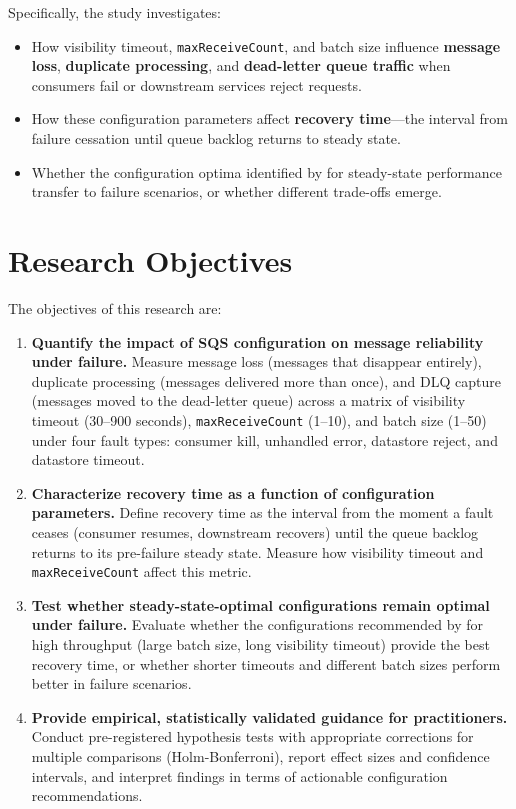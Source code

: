 Specifically, the study investigates:
\begin{itemize}
    \item How visibility timeout, \texttt{maxReceiveCount}, and batch size influence \textbf{message loss}, \textbf{duplicate processing}, and \textbf{dead-letter queue traffic} when consumers fail or downstream services reject requests.
    \item How these configuration parameters affect \textbf{recovery time}—the interval from failure cessation until queue backlog returns to steady state.
    \item Whether the configuration optima identified by \citet{Kyrychenko2025} for steady-state performance transfer to failure scenarios, or whether different trade-offs emerge.
\end{itemize}

\section{Research Objectives}

The objectives of this research are:

\begin{enumerate}
    \item \textbf{Quantify the impact of SQS configuration on message reliability under failure.} Measure message loss (messages that disappear entirely), duplicate processing (messages delivered more than once), and DLQ capture (messages moved to the dead-letter queue) across a matrix of visibility timeout (30–900 seconds), \texttt{maxReceiveCount} (1–10), and batch size (1–50) under four fault types: consumer kill, unhandled error, datastore reject, and datastore timeout.
    
    \item \textbf{Characterize recovery time as a function of configuration parameters.} Define recovery time as the interval from the moment a fault ceases (consumer resumes, downstream recovers) until the queue backlog returns to its pre-failure steady state. Measure how visibility timeout and \texttt{maxReceiveCount} affect this metric.
    
    \item \textbf{Test whether steady-state-optimal configurations remain optimal under failure.} Evaluate whether the configurations recommended by \citet{Kyrychenko2025} for high throughput (large batch size, long visibility timeout) provide the best recovery time, or whether shorter timeouts and different batch sizes perform better in failure scenarios.
    
    \item \textbf{Provide empirical, statistically validated guidance for practitioners.} Conduct pre-registered hypothesis tests with appropriate corrections for multiple comparisons (Holm-Bonferroni), report effect sizes and confidence intervals, and interpret findings in terms of actionable configuration recommendations.
\end{enumerate}

